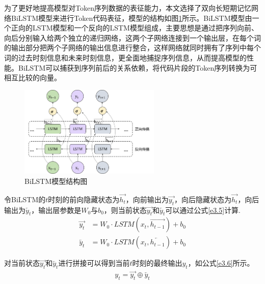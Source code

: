 为了更好地提高模型对Token序列数据的表征能力，本文选择了双向长短期记忆网络BiLSTM模型来进行Token代码表征，模型的结构如图\ref{fig:BiLSTM}所示。BiLSTM模型由一个正向的LSTM模型和一个反向的LSTM模型组成，主要思想是通过把序列向前、向后分别输入给两个独立的递归网络，这两个子网络连接到一个输出层，在每个词的输出部分把两个子网络的输出信息进行整合，这样网络就同时拥有了序列中每个词的过去时刻信息和未来时刻信息，更全面地捕捉序列信息，从而提高模型的性能。BiLSTM可以捕获到序列前后的关系依赖，将代码片段的Token序列转换为可相互比较的向量。
\begin{figure}[H] 
  \centering
  \includegraphics[width=0.6\textwidth]{figures/BiLSTM}
  \caption{BiLSTM模型结构图}\label{fig:BiLSTM}
\end{figure}

令BiLSTM的$t$时刻的前向隐藏状态为$\overrightarrow{h_t}$，向前输出为$\overrightarrow{y_t}$，向后隐藏状态为$\overrightarrow{h_t}$，向后输出为$\overleftarrow{y_t}$，输出层参数是$W_0$与$b_0$，则当前状态$\overrightarrow{y_t}$和$\overleftarrow{y_t}$可以通过公式\ref{e3.5}计算.
\begin{equation}\label{e3.5}
  \begin{split}
    \overrightarrow{y_t} &= W_0 \cdot LSTM\left(x_{t},\overrightarrow{h_{t-1}}\right) + b_0
    \\
    \overleftarrow{y_t} &= W_0 \cdot LSTM\left(x_{t},\overleftarrow{h_{t-1}}\right) + b_0
  \end{split}
\end{equation}

对当前状态$\overrightarrow{y_t}$和$\overleftarrow{y_t}$进行拼接可以得到当前$t$时刻的最终输出$y_t$，如公式\ref{e3.6}所示。
\begin{equation}\label{e3.6}
  \begin{split}
    y_t = \overrightarrow{y_t} \oplus\overleftarrow{y_t}
  \end{split}
\end{equation}

